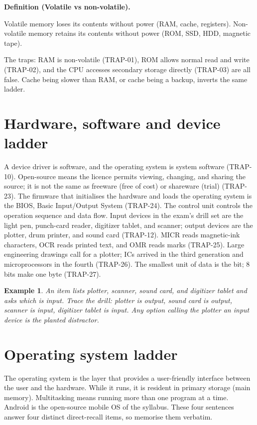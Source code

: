 \documentclass[11pt]{article}
\newtheorem{example}{Example}[section]
\newenvironment{definitionbox}[1]{%
  \par\noindent\textbf{Definition (#1).}\ \itshape
}{\par\vspace{0.3em}}
\begin{document}
\begin{definitionbox}{Volatile vs non-volatile}
Volatile memory loses its contents without power (RAM, cache, registers).
Non-volatile memory retains its contents without power (ROM, SSD, HDD,
magnetic tape).
\end{definitionbox}

The traps: RAM is non-volatile (TRAP-01), ROM allows normal read and write
(TRAP-02), and the CPU accesses secondary storage directly (TRAP-03) are all
false. Cache being slower than RAM, or cache being a backup, inverts the same
ladder.

\section{Hardware, software and device ladder}

A device driver is software, and the operating system is system software
(TRAP-10). Open-source means the licence permits viewing, changing, and
sharing the source; it is not the same as freeware (free of cost) or shareware
(trial) (TRAP-23). The firmware that initialises the hardware and loads the
operating system is the BIOS, Basic Input/Output System (TRAP-24). The control
unit controls the operation sequence and data flow. Input devices in the
exam's drill set are the light pen, punch-card reader, digitizer tablet, and
scanner; output devices are the plotter, drum printer, and sound card
(TRAP-12). MICR reads magnetic-ink characters, OCR reads printed text, and OMR
reads marks (TRAP-25). Large engineering drawings call for a plotter; ICs
arrived in the third generation and microprocessors in the fourth (TRAP-26).
The smallest unit of data is the bit; 8 bits make one byte (TRAP-27).

\begin{example}
An item lists plotter, scanner, sound card, and digitizer tablet and asks which
is input. Trace the drill: plotter is output, sound card is output, scanner is
input, digitizer tablet is input. Any option calling the plotter an input
device is the planted distractor.
\end{example}

\section{Operating system ladder}

The operating system is the layer that provides a user-friendly interface
between the user and the hardware. While it runs, it is resident in primary
storage (main memory). Multitasking means running more than one program at a
time. Android is the open-source mobile OS of the syllabus. These four
sentences answer four distinct direct-recall items, so memorise them verbatim.
\end{document}
